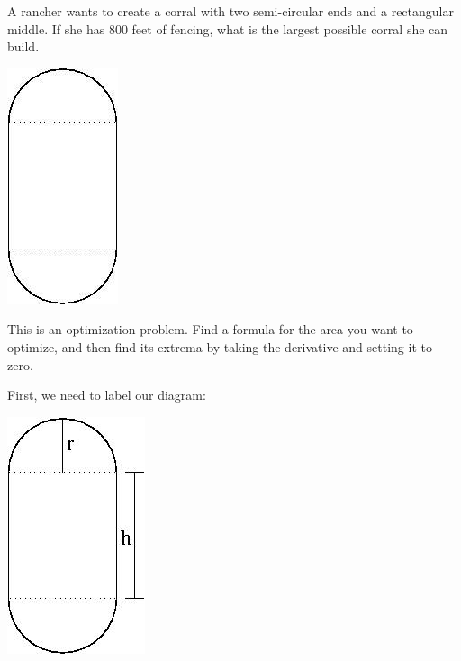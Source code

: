 \documentclass{ximera}
\author{Emma Smith Zbarsky}
\begin{document}
\begin{exercise}

A rancher wants to create a corral with two semi-circular ends and a
rectangular middle. If she has 800 feet of fencing, what is the largest
possible corral she can build.

\begin{image}\includegraphics{corral.jpg}\end{image}


\begin{hint}
This is an optimization problem. Find a formula for the area you want to
optimize, and then find its extrema by taking the derivative and setting
it to zero.
\end{hint}


\begin{hint}
First, we need to label our diagram:

\begin{image}\includegraphics{corral-labeled.jpg}\end{image}




\end{hint}
\end{exercise}
\end{document}
